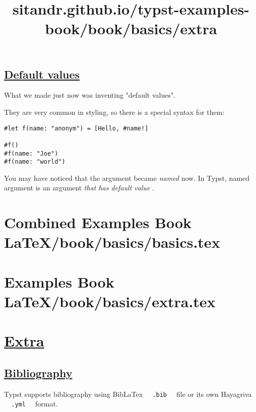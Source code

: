 \pandocbounded{}

\subsection{\texorpdfstring{\hyperref[default-values]{Default
values}}{Default values}}\label{default-values}

What we made just now was inventing "default values".

They are very common in styling, so there is a special syntax for them:

\begin{verbatim}
#let f(name: "anonym") = [Hello, #name!]

#f()
#f(name: "Joe")
#f(name: "world")
\end{verbatim}

\pandocbounded{}

You may have noticed that the argument became \emph{named} now. In
Typst, named argument is an argument \emph{that has default value} .




\section{Combined Examples Book LaTeX/book/basics/basics.tex}
\section{Examples Book LaTeX/book/basics/extra.tex}
\title{sitandr.github.io/typst-examples-book/book/basics/extra}

\section{\texorpdfstring{\hyperref[extra]{Extra}}{Extra}}\label{extra}

\subsection{\texorpdfstring{\hyperref[bibliography]{Bibliography}}{Bibliography}}\label{bibliography}

Typst supports bibliography using BibLaTex
\texttt{\ }{\texttt{\ .bib\ }}\texttt{\ } file or its own Hayagriva
\texttt{\ }{\texttt{\ .yml\ }}\texttt{\ } format.

